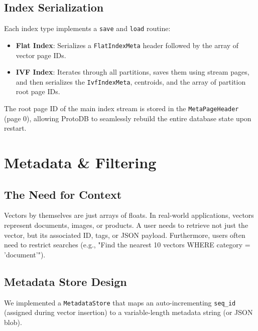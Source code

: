 \documentclass[12pt, a4paper]{report}
\begin{document}
\section{Index Serialization}
Each index type implements a \texttt{save} and \texttt{load} routine:
\begin{itemize}
    \item \textbf{Flat Index}: Serializes a \texttt{FlatIndexMeta} header followed by the array of vector page IDs.
    \item \textbf{IVF Index}: Iterates through all partitions, saves them using stream pages, and then serializes the \texttt{IvfIndexMeta}, centroids, and the array of partition root page IDs.
\end{itemize}

The root page ID of the main index stream is stored in the \texttt{MetaPageHeader} (page 0), allowing ProtoDB to seamlessly rebuild the entire database state upon restart.


\chapter{Metadata \& Filtering}

\section{The Need for Context}
Vectors by themselves are just arrays of floats. In real-world applications, vectors represent documents, images, or products. A user needs to retrieve not just the vector, but its associated ID, tags, or JSON payload. Furthermore, users often need to restrict searches (e.g., "Find the nearest 10 vectors WHERE category = 'document'").

\section{Metadata Store Design}
We implemented a \texttt{MetadataStore} that maps an auto-incrementing \texttt{seq\_id} (assigned during vector insertion) to a variable-length metadata string (or JSON blob).
\end{document}
